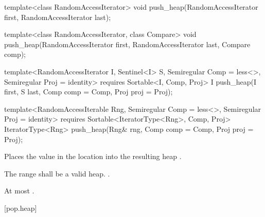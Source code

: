 %
\begin{removedblock}
\begin{itemdecl}
template<class RandomAccessIterator>
  void push_heap(RandomAccessIterator first, RandomAccessIterator last);

template<class RandomAccessIterator, class Compare>
  void push_heap(RandomAccessIterator first, RandomAccessIterator last,
                 Compare comp);
\end{itemdecl}
\end{removedblock}
\begin{addedblock}
\begin{itemdecl}
template<RandomAccessIterator I, Sentinel<I> S, Semiregular Comp = less<>,
    Semiregular Proj = identity>
  requires Sortable<I, Comp, Proj>
  I push_heap(I first, S last, Comp comp = Comp{}, Proj proj = Proj{});

template<RandomAccessIterable Rng, Semiregular Comp = less<>, Semiregular Proj = identity>
  requires Sortable<IteratorType<Rng>, Comp, Proj>
  IteratorType<Rng>
    push_heap(Rng& rng, Comp comp = Comp{}, Proj proj = Proj{});
\end{itemdecl}
\end{addedblock}

\begin{itemdescr}
\pnum
\effects
Places the value in the location
into the resulting heap
.

\pnum
\requires
The range
shall be a valid heap.
.

\begin{addedblock}
\pnum
\returns {}
\end{addedblock}

\pnum
\complexity
At most
.
\end{itemdescr}

[pop.heap]{}

